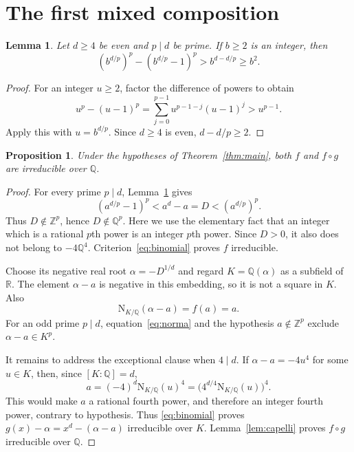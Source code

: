 \documentclass[11pt]{article}
\newtheorem{proposition}[theorem]{Proposition}
\newtheorem{lemma}[theorem]{Lemma}
\theoremstyle{remark}
\newcommand{\Q}{\mathbb{Q}}
\newcommand{\Z}{\mathbb{Z}}
\newcommand{\N}{\mathrm{N}}
\begin{document}
\section{The first mixed composition}
\begin{lemma}\label{lem:gap}
Let $d\geq4$ be even and $p\mid d$ be prime. If $b\geq2$ is an integer, then
\[
 (b^{d/p})^p-(b^{d/p}-1)^p>b^{d-d/p}\geq b^2.
\]
\end{lemma}
\begin{proof}
For an integer $u\geq2$, factor the difference of powers to obtain
\[
 u^p-(u-1)^p=\sum_{j=0}^{p-1}u^{p-1-j}(u-1)^j>u^{p-1}.
\]
Apply this with $u=b^{d/p}$. Since $d\geq4$ is even, $d-d/p\geq2$.
\end{proof}

\begin{proposition}\label{prop:first}
Under the hypotheses of Theorem~\ref{thm:main}, both $f$ and $f\circ g$ are irreducible over $\Q$.
\end{proposition}
\begin{proof}
For every prime $p\mid d$, Lemma~\ref{lem:gap} gives
\[
 (a^{d/p}-1)^p<a^d-a=D<(a^{d/p})^p.
\]
Thus $D\notin\Z^p$, hence $D\notin\Q^p$. Here we use the elementary fact that an integer which is a rational $p$th power is an integer $p$th power. Since $D>0$, it also does not belong to $-4\Q^4$. Criterion~\eqref{eq:binomial} proves $f$ irreducible.

Choose its negative real root $\alpha=-D^{1/d}$ and regard $K=\Q(\alpha)$ as a subfield of $\mathbb R$. The element $\alpha-a$ is negative in this embedding, so it is not a square in $K$. Also
\begin{equation}\label{eq:norma}
 \N_{K/\Q}(\alpha-a)=f(a)=a.
\end{equation}
For an odd prime $p\mid d$, equation~\eqref{eq:norma} and the hypothesis $a\notin\Z^p$ exclude $\alpha-a\in K^p$.

It remains to address the exceptional clause when $4\mid d$. If $\alpha-a=-4u^4$ for some $u\in K$, then, since $[K:\Q]=d$,
\[
 a=(-4)^d\N_{K/\Q}(u)^4
   =\bigl(4^{d/4}\N_{K/\Q}(u)\bigr)^4.
\]
This would make $a$ a rational fourth power, and therefore an integer fourth power, contrary to hypothesis. Thus \eqref{eq:binomial} proves $g(x)-\alpha=x^d-(\alpha-a)$ irreducible over $K$. Lemma~\ref{lem:capelli} proves $f\circ g$ irreducible over $\Q$.
\end{proof}
\end{document}
